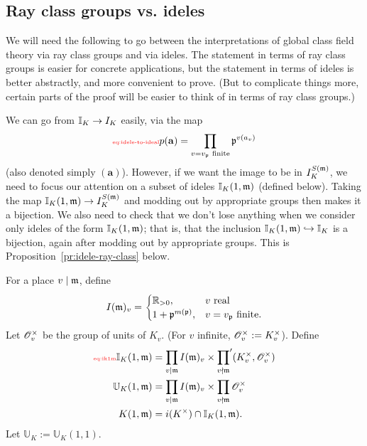 \subsection{Ray class groups vs. ideles}
We will need the following to go between the interpretations of global class field theory via ray class groups and via ideles. The statement in terms of ray class groups is easier for concrete applications, but the statement in terms of ideles is better abstractly, and more convenient to prove. (But to complicate things more, certain parts of the proof will be easier to think of in terms of ray class groups.)

We can go from $\mathbb{I}_K\to I_K$  easily, via the map
\begin{equation}\llabel{eq:idele-to-ideal}
p(\mathbf a) = \prod_{v=v_{\mfp}\text{ finite}} \mfp^{v(a_v)}
\end{equation}
(also denoted simply $(\mathbf a)$).
However, if we want the image to be in $I_K^{S(\mathfrak{m})}$, 
we need to focus our attention on a subset of ideles $\mathbb{I}_K(1,{\mathfrak{m}})$ (defined below). Taking the map $\mathbb{I}_K(1,{\mathfrak{m}})\to I_K^{S(\mathfrak{m})}$ and modding out by appropriate groups then makes it a bijection. We also need to check that we don't lose anything when we consider only ideles of the form $\mathbb{I}_K(1,{\mathfrak{m}})$; that is, that the inclusion $\mathbb{I}_K(1,{\mathfrak{m}})\hookrightarrow \mathbb{I}_K$ is a bijection, again after modding out by appropriate groups. This is Proposition~\ref{pr:idele-ray-class} below.
\begin{df}
For a place $v\mid \mathfrak{m}$, define
\[
I(\mathfrak{m})_v=\begin{cases}
\mathbb{R}_{>0},&v\text{ real}\\
1+\mathfrak{p}^{m(\mathfrak{p})},&v=v_{\mathfrak{p}}\text{ finite}.
\end{cases}
\]
Let $\mathscr{O}_v^{\times}$ be the group of units of $K_v$. (For $v$ infinite, $\mathscr{O}_v^{\times}:=K_v^{\times}$).
Define
\begin{align}
\llabel{eq:ik1m}
\I_K(1, \mm)&=\prod_{v\mid \mm} I(\mm)_v \times {\prod_{v\nmid \mm}}'(K_{v}^{\times},\sO_v^{\times})\\
\nonumber
\mathbb U_K(1,\mm)&=\prod_{v\mid \mm} I(\mm)_v \times \prod_{v\nmid \mm}\sO_{v}^{\times}\\
\nonumber
K(1, \mm)&=i(K^{\times})\cap \I_K(1, \mm).
\end{align}
Let $\mathbb U_K:=\mathbb U_K(1,1)$.
\end{df}

